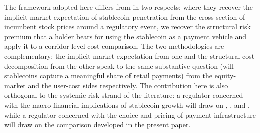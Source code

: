 The framework adopted here differs from \citet{copestake_etal_2026} in two respects: where they recover the implicit market expectation of stablecoin penetration from the cross-section of incumbent stock prices around a regulatory event, we recover the structural risk premium that a holder bears for using the stablecoin as a payment vehicle and apply it to a corridor-level cost comparison. The two methodologies are complementary: the implicit market expectation from one and the structural cost decomposition from the other speak to the same substantive question (will stablecoins capture a meaningful share of retail payments) from the equity-market and the user-cost sides respectively. The contribution here is also orthogonal to the systemic-risk strand of the literature: a regulator concerned with the macro-financial implications of stablecoin growth will draw on \citet{aldasoro_frost_ito_2026}, \citet{bis_wp_1219}, and \citet{anadu_etal_2023_runs}, while a regulator concerned with the choice and pricing of payment infrastructure will draw on the comparison developed in the present paper.
